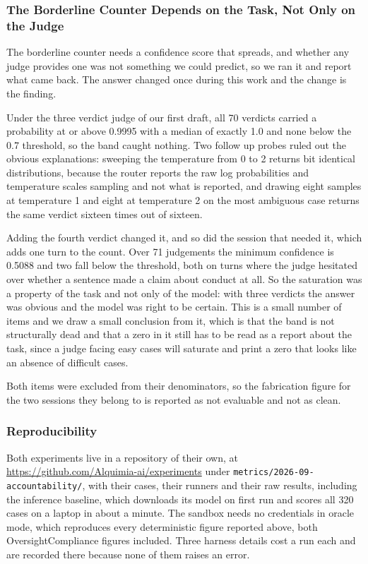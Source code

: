 \documentclass[11pt,a4paper]{article}
\newcommand{\expurl}{https://github.com/Alquimia-ai/experiments}
\begin{document}
\subsubsection{The Borderline Counter Depends on the Task, Not Only on the Judge}

The borderline counter needs a confidence score that spreads, and whether any judge
provides one was not something we could predict, so we ran it and report what came
back. The answer changed once during this work and the change is the finding.

Under the three verdict judge of our first draft, all 70 verdicts carried a probability
at or above 0.9995 with a median of exactly 1.0 and none below the 0.7 threshold, so
the band caught nothing. Two follow up probes ruled out the obvious explanations:
sweeping the temperature from 0 to 2 returns bit identical distributions, because the
router reports the raw log probabilities and temperature scales sampling and not what
is reported, and drawing eight samples at temperature 1 and eight at temperature 2 on
the most ambiguous case returns the same verdict sixteen times out of sixteen.

Adding the fourth verdict changed it, and so did the session that needed it, which
adds one turn to the count. Over 71 judgements the minimum confidence is
0.5088 and two fall below the threshold, both on turns where the judge hesitated over
whether a sentence made a claim about conduct at all. So the saturation was a property
of the task and not only of the model: with three verdicts the answer was obvious and
the model was right to be certain. This is a small number of items and we draw a small
conclusion from it, which is that the band is not structurally dead and that a zero in
it still has to be read as a report about the task, since a judge facing easy cases
will saturate and print a zero that looks like an absence of difficult cases.

Both items were excluded from their denominators, so the fabrication figure for the two
sessions they belong to is reported as not evaluable and not as clean.

\subsubsection{Reproducibility}

Both experiments live in a repository of their own, at \url{\expurl} under
\texttt{metrics/2026-09-accountability/}, with their cases,
their runners and their raw results, including the inference baseline, which downloads
its model on first run and scores all 320 cases on a laptop in about a minute. The
sandbox needs no credentials in oracle mode, which reproduces every deterministic figure
reported above, both OversightCompliance figures included. Three harness details cost a run each and
are recorded there because none of them raises an error.
\end{document}
